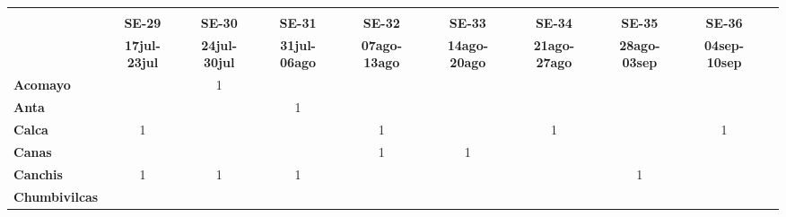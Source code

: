 \begin{tabular}{lccccccccc}
	\textbf{}              	  & \multicolumn{1}{l}{}                        & \multicolumn{1}{l}{}      & \multicolumn{1}{l}{}                         & \multicolumn{1}{l}{}                         & \multicolumn{1}{l}{}                         & \multicolumn{1}{l}{}                        & \multicolumn{1}{l}{}                         & \multicolumn{1}{l}{}     \\                   
	\textbf{}                                                                          		
	&\textbf{SE-29} 							&\textbf{SE-30}								&\textbf{SE-31} 							&\textbf{SE-32}								&\textbf{SE-33}								&\textbf{SE-34}								&\textbf{SE-35}								&\textbf{SE-36}\\							
	\textbf{}              	  		
	&\textbf{17jul-23jul}						&\textbf{24jul-30jul}						&\textbf{31jul-06ago}						&\textbf{07ago-13ago}						&\textbf{14ago-20ago}						&\textbf{21ago-27ago}						&\textbf{28ago-03sep}						&\textbf{04sep-10sep}\\
	\textbf{Acomayo}                        		
	&\cellcolor[HTML]{FCC46C}
	&1											&\cellcolor[HTML]{FCC46C}
	&\cellcolor[HTML]{FCC46C}					&\cellcolor[HTML]{FCC46C}
	&\cellcolor[HTML]{FCC46C}					&\cellcolor[HTML]{FCC46C}
	&\cellcolor[HTML]{FCC46C}\\
	\textbf{Anta}                                                   		
	&\cellcolor[HTML]{FCC46C}					&\cellcolor[HTML]{FCC46C}					&1											&\cellcolor[HTML]{FCC46C}					&\cellcolor[HTML]{FCC46C}					&\cellcolor[HTML]{FCC46C}					&\cellcolor[HTML]{FCC46C}					&\cellcolor[HTML]{FCC46C}\\					
	\textbf{Calca}      				       								            
	&1  										&\cellcolor[HTML]{FCC46C}	 	 	    	&\cellcolor[HTML]{FCC46C}					&1											&\cellcolor[HTML]{FCC46C}					&1											&\cellcolor[HTML]{FCC46C}					&1\\          			
	\textbf{Canas}                              											
	&\cellcolor[HTML]{FCC46C}					&\cellcolor[HTML]{FCC46C}					&\cellcolor[HTML]{FCC46C}					&1											
	&1											&\cellcolor[HTML]{FCC46C}					&\cellcolor[HTML]{FCC46C}					&\cellcolor[HTML]{FCC46C}\\	
	\textbf{Canchis}                             											
	&1											&1											&1											&\cellcolor[HTML]{FCC46C}					&\cellcolor[HTML]{FCC46C}					&\cellcolor[HTML]{FCC46C}					&1											&\cellcolor[HTML]{FCC46C}\\				
	\textbf{Chumbivilcas}                      												

\end{tabular}
